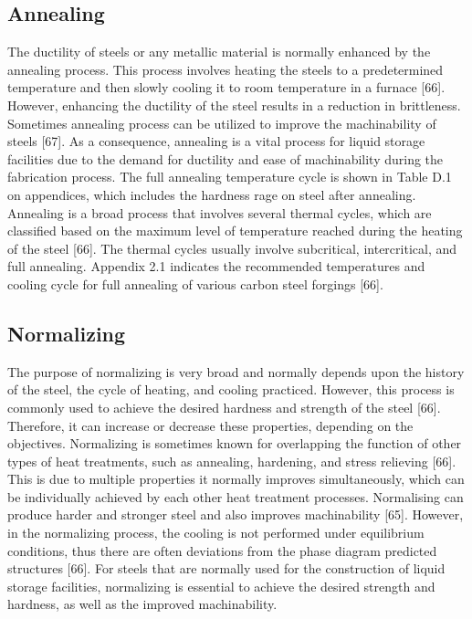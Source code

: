 \documentclass[12pt]{report}
\begin{document}
\subsection{Annealing}
The ductility of steels or any metallic material is normally enhanced by the annealing process. This process involves heating the steels to a predetermined temperature and then slowly cooling it to room temperature in a furnace [66]. However, enhancing the ductility of the steel results in a reduction in brittleness. Sometimes annealing process can be utilized to improve the machinability of steels [67]. As a consequence, annealing is a vital process for liquid storage facilities due to the demand for ductility and ease of machinability during the fabrication process. The full annealing temperature cycle is shown in Table D.1 on appendices, which includes the hardness rage on steel after annealing. 
Annealing is a broad process that involves several thermal cycles, which are classified based on the maximum level of temperature reached during the heating of the steel [66]. The thermal cycles usually involve subcritical, intercritical, and full annealing. Appendix 2.1 indicates the recommended temperatures and cooling cycle for full annealing of various carbon steel forgings [66]. 

\subsection{Normalizing}
The purpose of normalizing is very broad and normally depends upon the history of the steel, the cycle of heating, and cooling practiced. However, this process is commonly used to achieve the desired hardness and strength of the steel [66]. Therefore, it can increase or decrease these properties, depending on the objectives. 
Normalizing is sometimes known for overlapping the function of other types of heat treatments, such as annealing, hardening, and stress relieving [66]. This is due to multiple properties it normally improves simultaneously, which can be individually achieved by each other heat treatment processes. Normalising can produce harder and stronger steel and also improves machinability [65]. However, in the normalizing process, the cooling is not performed under equilibrium conditions, thus there are often deviations from the phase diagram predicted structures [66].  For steels that are normally used for the construction of liquid storage facilities, normalizing is essential to achieve the desired strength and hardness, as well as the improved machinability.
\end{document}
